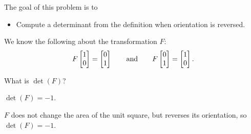 
	\displayonlynewpage
	\bookonlynewpage
	\question
	\begin{annotation}
		\begin{goals}

			The goal of this problem is to
			\begin{itemize}
				\item Compute a determinant from the definition when orientation is reversed.
			\end{itemize}
		\end{goals}
	\end{annotation}
	We know the following about the transformation $F$:
	\[
		F\mat{1\\0}=\mat{0\\1}\qquad\text{and}\qquad F\mat{0\\1}=\mat{1\\0}.
	\]
	\begin{parts}
		\item What is $\det(F)$?
			\begin{solution}
				$\det(F)=-1$.

				$F$ does not change the area of the unit square, but reverses its
				orientation, so $\det(F)=-1$.
			\end{solution}
	\end{parts}


